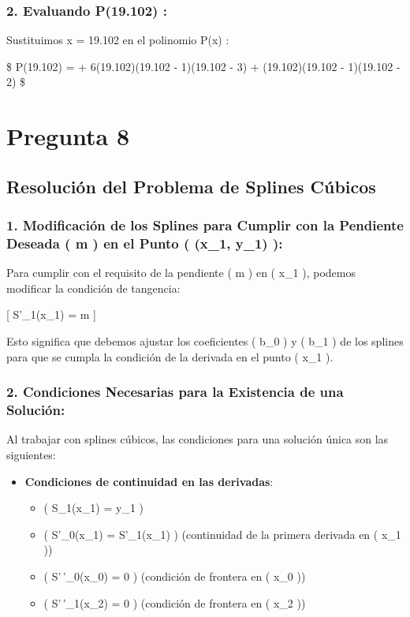 \documentclass[
  letterpaper,
  DIV=11,
  numbers=noendperiod]{scrartcl}
\providecommand{\tightlist}{%
  \setlength{\itemsep}{0pt}\setlength{\parskip}{0pt}}\usepackage{longtable,booktabs,array}
\begin{document}
\subsubsection{2. Evaluando P(19.102) :}\label{evaluando-p19.102}

Sustituimos x = 19.102 en el polinomio P(x) :

\$ P(19.102) =  +
6(19.102)(19.102 - 1)(19.102 - 3) + (19.102)(19.102 - 1)(19.102 - 2) \$

\section{Pregunta 8}\label{pregunta-8}

\subsection{Resolución del Problema de Splines
Cúbicos}\label{resoluciuxf3n-del-problema-de-splines-cuxfabicos}

\subsubsection{1. Modificación de los Splines para Cumplir con la
Pendiente Deseada ( m ) en el Punto ( (x\_1, y\_1)
):}\label{modificaciuxf3n-de-los-splines-para-cumplir-con-la-pendiente-deseada-m-en-el-punto-x_1-y_1}

Para cumplir con el requisito de la pendiente ( m ) en ( x\_1 ), podemos
modificar la condición de tangencia:

{[} S'\_1(x\_1) = m {]}

Esto significa que debemos ajustar los coeficientes ( b\_0 ) y ( b\_1 )
de los splines para que se cumpla la condición de la derivada en el
punto ( x\_1 ).

\subsubsection{2. Condiciones Necesarias para la Existencia de una
Solución:}\label{condiciones-necesarias-para-la-existencia-de-una-soluciuxf3n}

Al trabajar con splines cúbicos, las condiciones para una solución única
son las siguientes:

\begin{itemize}
\tightlist
\item
  \textbf{Condiciones de continuidad en las derivadas}:

  \begin{itemize}
  \tightlist
  \item
    ( S\_1(x\_1) = y\_1 )
  \item
    ( S'\_0(x\_1) = S'\_1(x\_1) ) (continuidad de la primera derivada en
    ( x\_1 ))
  \item
    ( S'\,'\_0(x\_0) = 0 ) (condición de frontera en ( x\_0 ))
  \item
    ( S'\,'\_1(x\_2) = 0 ) (condición de frontera en ( x\_2 ))
  \end{itemize}
\end{itemize}
\end{document}
